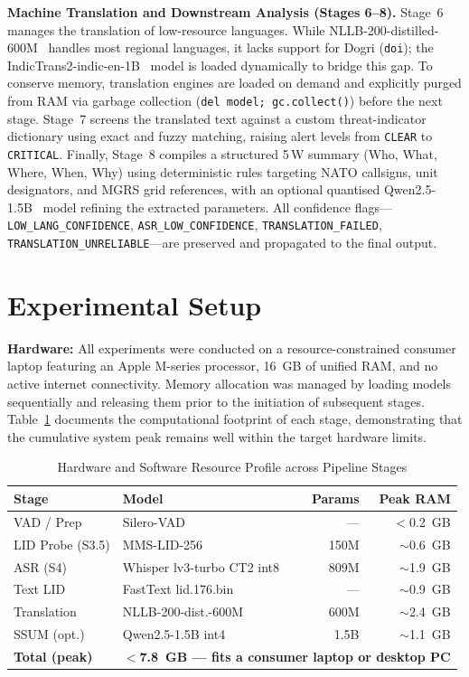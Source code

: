 \documentclass[conference]{IEEEtran}
\begin{document}
\textbf{Machine Translation and Downstream Analysis (Stages 6--8).}
Stage~6 manages the translation of low-resource languages. While NLLB-200-distilled-600M~\cite{costajussa2024nllb} handles most regional languages, it lacks support for Dogri (\texttt{doi}); the IndicTrans2-indic-en-1B~\cite{gala2023indictrans2} model is loaded dynamically to bridge this gap. To conserve memory, translation engines are loaded on demand and explicitly purged from RAM via garbage collection (\texttt{del model; gc.collect()}) before the next stage. Stage~7 screens the translated text against a custom threat-indicator dictionary using exact and fuzzy matching, raising alert levels from \texttt{CLEAR} to \texttt{CRITICAL}. Finally, Stage~8 compiles a structured 5\,W summary (Who, What, Where, When, Why) using deterministic rules targeting NATO callsigns, unit designators, and MGRS grid references, with an optional quantised Qwen2.5-1.5B~\cite{qwen2025} model refining the extracted parameters. All confidence flags---\texttt{LOW\_LANG\_CONFIDENCE}, \texttt{ASR\_LOW\_CONFIDENCE}, \texttt{TRANSLATION\_FAILED}, \texttt{TRANSLATION\_UNRELIABLE}---are preserved and propagated to the final output.

\section{Experimental Setup}

\textbf{Hardware:}
All experiments were conducted on a resource-constrained consumer laptop featuring an Apple M-series processor, 16~GB of unified RAM, and no active internet connectivity. Memory allocation was managed by loading models sequentially and releasing them prior to the initiation of subsequent stages. Table~\ref{tab:hw} documents the computational footprint of each stage, demonstrating that the cumulative system peak remains well within the target hardware limits.

\begin{table}[htbp]
\caption{Hardware and Software Resource Profile across Pipeline Stages}
\label{tab:hw}
\begin{center}
\scriptsize
\begin{tabular}{p{1.6cm}p{2.3cm}rr}
\toprule
\textbf{Stage} & \textbf{Model} & \textbf{Params} & \textbf{Peak RAM} \\
\midrule
VAD / Prep & Silero-VAD & --- & $<$0.2~GB \\
LID Probe (S3.5) & MMS-LID-256 & 150M & $\sim$0.6~GB \\
ASR (S4) & Whisper lv3-turbo CT2 int8 & 809M & $\sim$1.9~GB \\
Text LID & FastText lid.176.bin & --- & $\sim$0.9~GB \\
Translation & NLLB-200-dist.-600M & 600M & $\sim$2.4~GB \\
SSUM (opt.) & Qwen2.5-1.5B int4 & 1.5B & $\sim$1.1~GB \\
\midrule
\textbf{Total (peak)} & \multicolumn{3}{r}{\textbf{$<$7.8~GB --- fits a consumer laptop or desktop PC}} \\
\bottomrule
\end{tabular}
\end{center}
\end{table}
\end{document}
